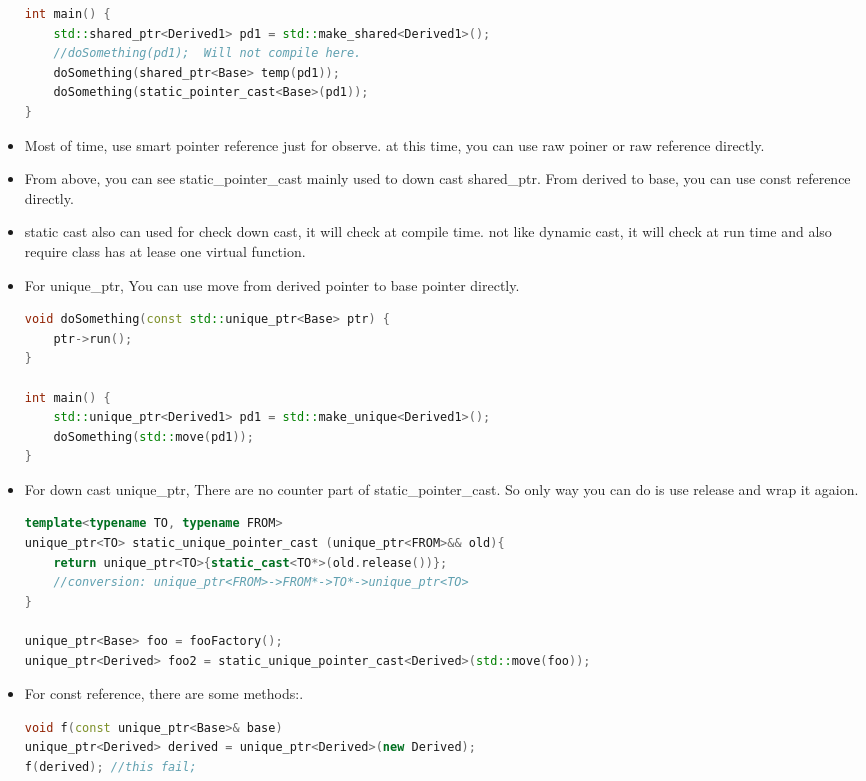 \documentclass[a4paper,12pt,twoside]{book}
\begin{document}
\begin{itemize}
\begin{lstlisting}[frame=single, language=c++, mathescape=true]
int main() {
	std::shared_ptr<Derived1> pd1 = std::make_shared<Derived1>();
	//doSomething(pd1);  Will not compile here.
	doSomething(shared_ptr<Base> temp(pd1));
	doSomething(static_pointer_cast<Base>(pd1));
}
\end{lstlisting}


\item Most of time, use smart pointer reference just for observe. at this time, you can use raw poiner or raw reference directly. 

\item From above, you can see static\_pointer\_cast mainly used to down cast shared\_ptr. From derived to base, you can use const reference directly.

\item static cast also can used for check down cast, it will check at compile time. not like dynamic cast, it will check at run time and also require class has at lease one virtual function.


\item For unique\_ptr, You can use move from derived pointer to base pointer directly.
\begin{lstlisting}[frame=single, language=c++, mathescape=true]
void doSomething(const std::unique_ptr<Base> ptr) {
    ptr->run();
}

int main() {
    std::unique_ptr<Derived1> pd1 = std::make_unique<Derived1>();
    doSomething(std::move(pd1));
}
\end{lstlisting}

\item For down cast unique\_ptr, There are no counter part of static\_pointer\_cast. So only way you can do is use release and wrap it agaion.

\begin{lstlisting}[frame=single, language=c++, mathescape=true]
template<typename TO, typename FROM>
unique_ptr<TO> static_unique_pointer_cast (unique_ptr<FROM>&& old){
	return unique_ptr<TO>{static_cast<TO*>(old.release())};
	//conversion: unique_ptr<FROM>->FROM*->TO*->unique_ptr<TO>
}

unique_ptr<Base> foo = fooFactory();
unique_ptr<Derived> foo2 = static_unique_pointer_cast<Derived>(std::move(foo));
\end{lstlisting}

\item For const reference, there are some methods:.
\begin{lstlisting}[frame=single, language=c++, mathescape=true]
void f(const unique_ptr<Base>& base)
unique_ptr<Derived> derived = unique_ptr<Derived>(new Derived);
f(derived); //this fail;


\end{lstlisting}
\end{itemize}
\end{document}

